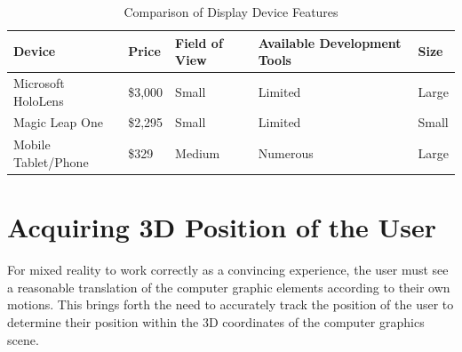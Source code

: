 \documentclass[10pt,draftclsnofoot,onecolumn,letterpaper]{IEEEtran}
\begin{document}
\begin{table}[ht]
\begin{center}
\caption{Comparison of Display Device Features}
\label{table:1}
 \begin{tabular}{|p{3cm}|p{1cm}|p{2cm}|p{5cm}|p{2cm}|}
 \hline
 Device & Price & Field of View & Available Development Tools & Size \\ [0.5ex]
 \hline\hline
 Microsoft HoloLens & \$3,000 & Small & Limited & Large \\
 \hline
 Magic Leap One & \$2,295 & Small & Limited & Small \\
 \hline
 Mobile Tablet/Phone & \$329 & Medium & Numerous & Large \\
 \hline
\end{tabular}
\end{center}
\end{table}

\section{Acquiring 3D Position of the User}
For mixed reality to work correctly as a convincing experience, the user must see a reasonable translation of the computer graphic elements according to their own motions. This brings forth the need to accurately track the position of the user to determine their position within the 3D coordinates of the computer graphics scene.\par
\end{document}
